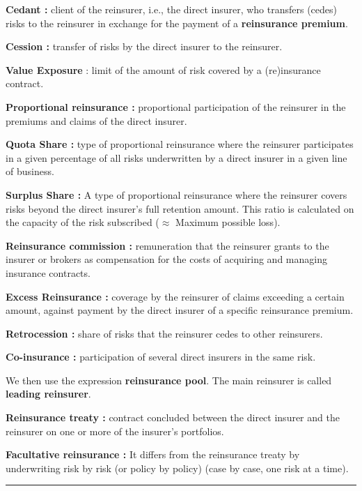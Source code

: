 
\begin{f}

\textbf{Cedant :} client of the reinsurer, i.e., the direct insurer, who transfers (cedes) risks to the reinsurer in exchange for the payment
of a \textbf{reinsurance premium}.

\textbf{Cession :} transfer of risks by the direct insurer to the reinsurer.

\textbf{Value Exposure} : limit of the amount of risk covered by a (re)insurance contract.

\textbf{Proportional reinsurance :} proportional participation of the reinsurer in the premiums and claims of the direct insurer.

\textbf{Quota Share :} type of proportional reinsurance where the reinsurer participates in a given percentage of all risks underwritten by a direct insurer in a given line of business.

\textbf{Surplus Share :} A type of proportional reinsurance where the reinsurer covers risks beyond the direct insurer's 
full retention amount. This ratio is calculated on the capacity of the risk subscribed (\(\approx\) Maximum possible loss).

\textbf{Reinsurance commission :} remuneration that the reinsurer grants to the insurer or brokers as compensation for the costs of acquiring and managing insurance contracts.

\textbf{Excess Reinsurance :}
 coverage by the reinsurer of claims exceeding a certain amount, against payment by the direct insurer of a specific reinsurance premium.

\textbf{Retrocession :}  share of risks that the reinsurer cedes to other reinsurers.

\textbf{Co-insurance :} participation of several direct insurers in the same risk.

We then use the expression \textbf{reinsurance pool}.
The main reinsurer is called \textbf{leading reinsurer}.

\textbf{Reinsurance treaty :} contract concluded between the direct insurer and the reinsurer on one or more of the insurer's portfolios.

\textbf{Facultative reinsurance :}
It differs from the reinsurance treaty by underwriting risk by risk (or policy by policy) (case by case, one risk at a time).

\end{f}
\hrule




